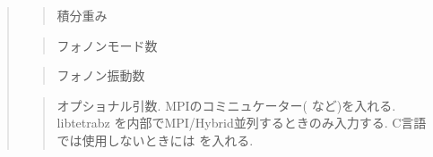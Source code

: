 \documentclass[letterpaper,10pt,dvipdfmx,openany]{sphinxmanual}
\begin{document}
\begin{quote}
\begin{quote}
\sphinxAtStartPar
積分重み
\end{quote}

\begin{sphinxVerbatim}[commandchars=\\\{\}]
\end{sphinxVerbatim}
\begin{quote}

\sphinxAtStartPar
フォノンモード数
\end{quote}

\begin{sphinxVerbatim}[commandchars=\\\{\}]
\end{sphinxVerbatim}
\begin{quote}

\sphinxAtStartPar
フォノン振動数
\end{quote}

\begin{sphinxVerbatim}[commandchars=\\\{\}]
\end{sphinxVerbatim}
\begin{quote}

\sphinxAtStartPar
オプショナル引数.
MPIのコミニュケーター(  など)を入れる.
libtetrabz を内部でMPI/Hybrid並列するときのみ入力する.
C言語では使用しないときには  を入れる.
\end{quote}
\end{quote}
\end{document}
